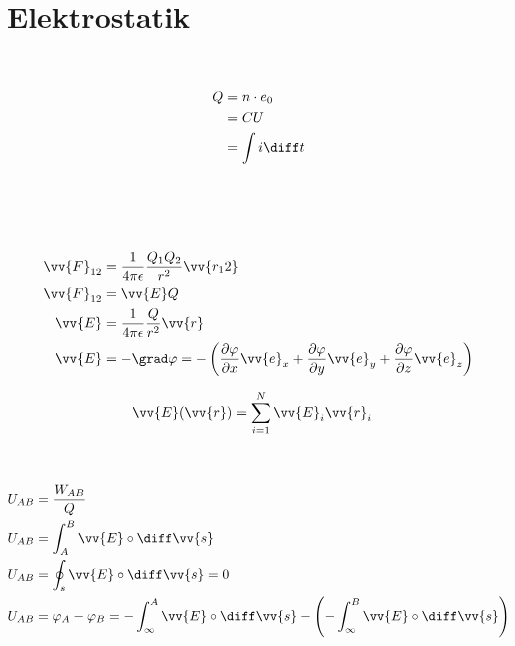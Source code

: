 \section{Elektrostatik}

\begin{boxleft}
\\
\end{boxleft}\begin{boxrightshaded}
\begin{align}
Q	&=n\cdot e_0\\
	&=CU\\
	&=\int i \diff t
\end{align}
\end{boxrightshaded}


\begin{boxleft}
\\
\\
\\
\end{boxleft}\begin{boxrightshaded}
\begin{align}
\vv{F}_{12}&=\frac{1}{4\pi\epsilon}\frac{Q_1Q_2}{r^2}\vv{r_12}\\
\vv{F}_{12}&=\vv{E}Q\\
\vv{E}&=\frac{1}{4\pi\epsilon}\frac{Q}{r^2}\vv{r}\\
\vv{E}&=-\grad\varphi=-\left(\frac{\partial \varphi}{\partial x}\vv{e}_x+\frac{\partial \varphi}{\partial y}\vv{e}_y+\frac{\partial \varphi}{\partial z}\vv{e}_z\right)
\end{align}
\end{boxrightshaded}

\begin{boxleft}
\end{boxleft}\begin{boxrightshaded}
\begin{align}
\vv{E}(\vv{r})&=\sum_{i=1}^{N}\vv{E}_i{\vv{r}_i}
\end{align}
\end{boxrightshaded}

\begin{boxleft}
\\
\end{boxleft}\begin{boxrightshaded}
\begin{align}
U_{AB}&=\frac{W_{AB}}{Q}\\
U_{AB}&=\int_A^B\vv{E}\circ\diff\vv{s}\\
U_{AB}&=\oint_s\vv{E}\circ\diff\vv{s}=0\\
U_{AB}&=\varphi_A-\varphi_B=-\int_\infty^A\vv{E}\circ\diff\vv{s}-\left(-\int_\infty^B\vv{E}\circ\diff\vv{s}\right)
\end{align}
\end{boxrightshaded}

